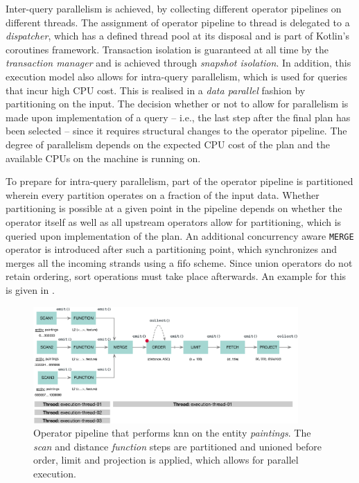 Inter-query parallelism is achieved, by collecting different operator pipelines on different threads. The assignment of operator pipeline to thread is delegated to a \emph{dispatcher}, which has a defined thread pool at its disposal and is part of Kotlin's coroutines framework. Transaction isolation is guaranteed at all time by the \emph{transaction manager} and is achieved through \emph{snapshot isolation}. In addition, this execution model also allows for intra-query parallelism, which is used for queries that incur high CPU cost. This is realised in a \emph{data parallel} fashion by partitioning on the input. The decision whether or not to allow for parallelism is made upon implementation of a query -- i.e., the last step after the final plan has been selected -- since it requires structural changes to the operator pipeline. The degree of parallelism depends on the expected CPU cost of the plan and the available CPUs on the machine \cottontail{} is running on.

To prepare for intra-query parallelism, part of the operator pipeline is partitioned wherein every partition operates on a fraction of the input data. Whether partitioning is possible at a given point in the pipeline depends on whether the operator itself as well as all upstream operators allow for partitioning, which is queried upon implementation of the plan. An additional concurrency aware \texttt{MERGE} operator is introduced after such a partitioning point, which synchronizes and merges all the incoming strands using a \acrshort{fifo} scheme. Since union operators do not retain ordering, sort operations must take place afterwards. An example for this is given in .

\begin{figure}[bt]
    \centering
    \includegraphics[width=0.9\textwidth]{figures/execution-model-parallel}
    \caption{Operator pipeline that performs \acrshort{knn} on the entity \emph{paintings}. The \emph{scan} and distance \emph{function} steps are partitioned and unioned before order, limit and projection is applied, which allows for parallel execution.}
    \label{figure:cottontail_execution_model_parallel}
\end{figure}

